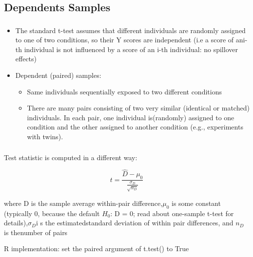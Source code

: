 \documentclass[t, 11pt]{beamer}
\begin{document}
	 \subsection{Dependents Samples}

	\begin{frame}
		\frametitle{\insertsection} 
		\framesubtitle{\insertsubsection} 
		\begin{itemize}
		\item The standard t-test assumes that different individuals are randomly assigned to one of two conditions, so their Y scores are independent (i.e a score of ani-th individual is not influenced by a score of an i-th individual: no spillover effects)
		
		\item Dependent (paired) samples:
		\begin{itemize}
		\item	Same individuals sequentially exposed to two different conditions
		
		\item There are many pairs consisting of two very similar (identical or matched) individuals. In each pair, one individual is(randomly) assigned to one condition and the other assigned to another condition (e.g., experiments with twins).
	\end{itemize}
	\end{itemize}
		
	\end{frame}	

	\begin{frame}
	\frametitle{\insertsection} 
	\framesubtitle{\insertsubsection} 
		
		Test statistic is computed in a different way:
		
		$$t = \frac{\hat{D} - \mu_0}{  \frac{\sigma_D}{  \sqrt{n_D}  }    }$$
		
		where D is the sample average within-pair difference,$\mu_0$ is some constant (typically 0, because the default $H_0$: D = 0; read about one-sample t-test for details),$\sigma_D$i s the estimatedstandard deviation of within pair differences, and $n_D$ is thenumber of pairs
		
		\vspace{1cm}
		
	R implementation: set the paired argument of t.test() to True
\end{frame}	
\end{document}
